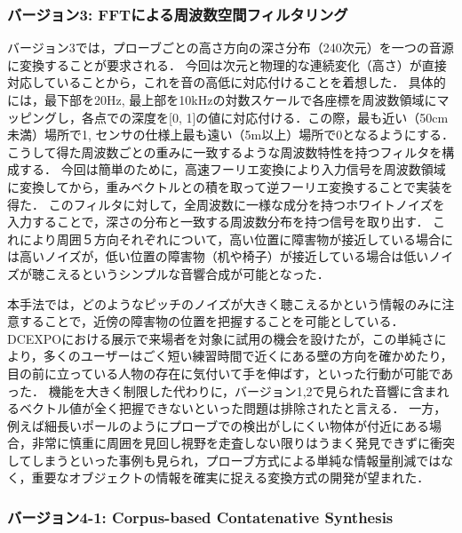 \subsubsection{バージョン3: FFTによる周波数空間フィルタリング}

バージョン3では，プローブごとの高さ方向の深さ分布（240次元）を一つの音源に変換することが要求される．
今回は次元と物理的な連続変化（高さ）が直接対応していることから，これを音の高低に対応付けることを着想した．
具体的には，最下部を20Hz, 最上部を10kHzの対数スケールで各座標を周波数領域にマッピングし，各点での深度を[0, 1]の値に対応付ける．この際，最も近い（50cm未満）場所で1, センサの仕様上最も遠い（5m以上）場所で0となるようにする．
こうして得た周波数ごとの重みに一致するような周波数特性を持つフィルタを構成する．
今回は簡単のために，高速フーリエ変換により入力信号を周波数領域に変換してから，重みベクトルとの積を取って逆フーリエ変換することで実装を得た．
このフィルタに対して，全周波数に一様な成分を持つホワイトノイズを入力することで，深さの分布と一致する周波数分布を持つ信号を取り出す．
これにより周囲５方向それぞれについて，高い位置に障害物が接近している場合には高いノイズが，低い位置の障害物（机や椅子）が接近している場合は低いノイズが聴こえるというシンプルな音響合成が可能となった．

本手法では，どのようなピッチのノイズが大きく聴こえるかという情報のみに注意することで，近傍の障害物の位置を把握することを可能としている．
DCEXPOにおける展示で来場者を対象に試用の機会を設けたが，この単純さにより，多くのユーザーはごく短い練習時間で近くにある壁の方向を確かめたり，目の前に立っている人物の存在に気付いて手を伸ばす，といった行動が可能であった．
機能を大きく制限した代わりに，バージョン1,2で見られた音響に含まれるベクトル値が全く把握できないといった問題は排除されたと言える．
一方，例えば細長いポールのようにプローブでの検出がしにくい物体が付近にある場合，非常に慎重に周囲を見回し視野を走査しない限りはうまく発見できずに衝突してしまうといった事例も見られ，プローブ方式による単純な情報量削減ではなく，重要なオブジェクトの情報を確実に捉える変換方式の開発が望まれた．

\subsubsection{バージョン4-1: Corpus-based Contatenative Synthesis}

